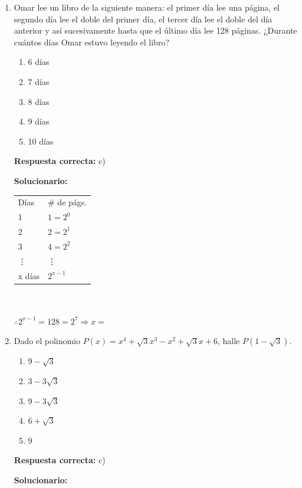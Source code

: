 \begin{enumerate}[resume]
	
	\item Omar lee un libro de la siguiente manera: el primer día lee una página, el segundo día lee el doble del primer día, el tercer día lee el doble del día anterior y así sucesivamente hasta que el último día lee 128 páginas. ¿Durante cuántos días Omar estuvo leyendo el libro?
	\begin{enumerate}[label=\alph*)]
		\item 6 días
		\item 7 días
		\item 8 días
		\item 9 días
		\item 10 días
	\end{enumerate}
	\textbf{Respuesta correcta:} c)
	
	\vspace{2mm}
	\textbf{Solucionario:}
	
	\begin{tabular}{ll}
		Días & \# de págs. \\
		1 & $1 = 2^0$ \\
		2 & $2 = 2^1$ \\
		3 & $4 = 2^2$ \\
		\vdots & \vdots \\
		x días & $2^{x-1}$
	\end{tabular} \\
	\\
	$\therefore 2^{x-1} = 128 = 2^7 \Rightarrow x = $
	
	\vspace{6mm}
	
	\item Dado el polinomio $P(x) = x^4 + \sqrt{3}x^3 - x^2 + \sqrt{3}x + 6$, halle $P(1-\sqrt{3})$.
	\begin{enumerate}[label=\alph*)]
		\item $9 - \sqrt{3}$
		\item $3 - 3\sqrt{3}$
		\item $9 - 3\sqrt{3}$
		\item $6 + \sqrt{3}$
		\item 9
	\end{enumerate}
	\textbf{Respuesta correcta:} c)
	
	\vspace{2mm}
	\textbf{Solucionario:}
	

\end{enumerate}
